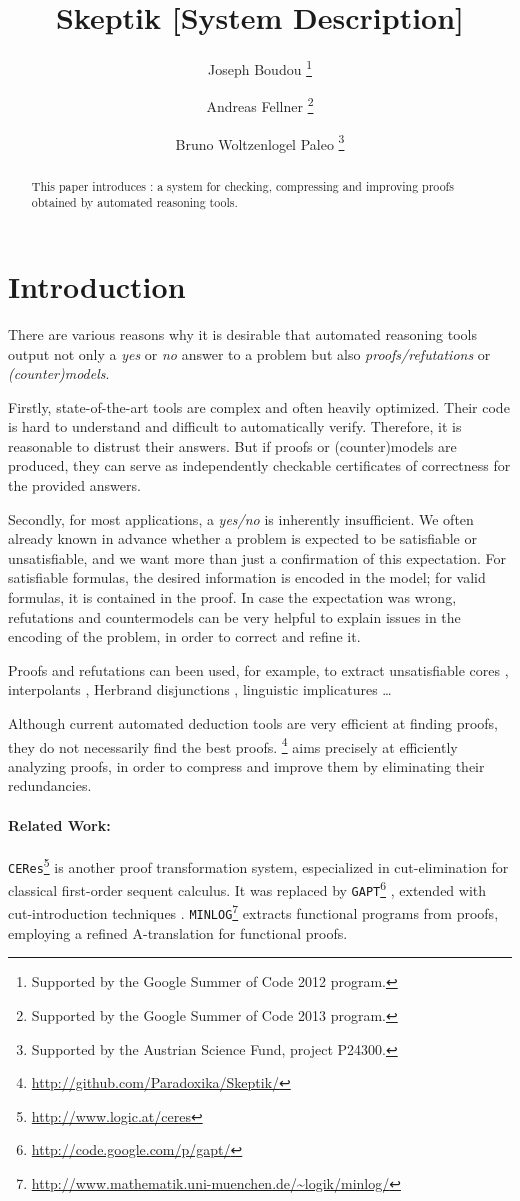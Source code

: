 \documentclass{llncs}
\title{ 
Skeptik [System Description]
}
\author{
  Joseph Boudou\inst{1}
  \thanks{Supported by the Google Summer of Code 2012 program.}
  \and 
  Andreas Fellner\inst{2,3}
  \thanks{Supported by the Google Summer of Code 2013 program.}
  \and 
  Bruno Woltzenlogel Paleo\inst{3}
  \thanks{Supported by the Austrian Science Fund, project P24300.}
}
\institute{
  IRIT, Universit\'e de Toulouse, France \\
  \email{joseph.boudou@irit.fr}
  \and 
  Free University of Bolzano, Italy \\
  \email{fellner.a@gmail.com}
  \and 
  Vienna University of Technology, Austria \\
  \email{bruno@logic.at}
}
\begin{document}
\maketitle


\begin{abstract}
This paper introduces \skeptik: a system for checking, compressing and improving proofs obtained by automated reasoning tools.
\end{abstract}

\setcounter{footnote}{0}


\section{Introduction}

There are various reasons why it is desirable 
that automated reasoning
tools output not only a \emph{yes} or \emph{no} answer to a problem 
but also \emph{proofs/refutations} or \emph{(counter)models}. 

Firstly, state-of-the-art tools are complex and often heavily optimized. 
Their code is hard to understand and difficult to automatically verify.
Therefore, it is reasonable to distrust their answers. 
But if proofs or (counter)models are produced, 
they can serve as independently checkable certificates of 
correctness for the provided answers. 

Secondly, for most applications, a \emph{yes/no} is inherently insufficient. We often already known in advance whether a problem is expected to be satisfiable or unsatisfiable, and we want more than just a confirmation of this expectation. For satisfiable formulas, the desired information is encoded in the model; for valid formulas, it is contained in the proof. In case the expectation was wrong, refutations and countermodels can be very helpful to explain issues in the encoding of the problem, in order to correct and refine it.

Proofs and refutations can been used, for example, to extract unsatisfiable cores \cite{ToDo}, interpolants \cite{ToDo}, Herbrand disjunctions \cite{ToDo}, linguistic implicatures \cite{ToDo} \ldots

Although current automated deduction tools are very efficient at finding proofs, they do not necessarily find the best proofs. {\skeptik}\footnote{\url{http://github.com/Paradoxika/Skeptik/}} aims precisely at efficiently analyzing proofs, in order to compress and improve them by eliminating their redundancies.


\paragraph{Related Work:} \texttt{CERes}\footnote{\url{http://www.logic.at/ceres}} \cite{ToDo} is another proof transformation system, especialized in cut-elimination for classical first-order sequent calculus. It was replaced by \texttt{GAPT}\footnote{\url{http://code.google.com/p/gapt/}} \cite{ToDo}, extended with cut-introduction techniques \cite{ToDo}. \texttt{MINLOG}\footnote{\url{http://www.mathematik.uni-muenchen.de/~logik/minlog/}} \cite{ToDo} extracts functional programs from proofs, employing a refined A-translation for functional proofs.
\end{document}
